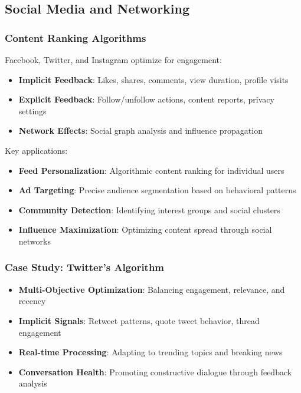 \documentclass[acmsmall,review,anonymous]{acmart}
\begin{document}
\subsection{Social Media and Networking}

\subsubsection{Content Ranking Algorithms}

Facebook, Twitter, and Instagram optimize for engagement:

\begin{itemize}
    \item \textbf{Implicit Feedback}: Likes, shares, comments, view duration, profile visits
    \item \textbf{Explicit Feedback}: Follow/unfollow actions, content reports, privacy settings
    \item \textbf{Network Effects}: Social graph analysis and influence propagation
\end{itemize}

Key applications:
\begin{itemize}
    \item \textbf{Feed Personalization}: Algorithmic content ranking for individual users
    \item \textbf{Ad Targeting}: Precise audience segmentation based on behavioral patterns
    \item \textbf{Community Detection}: Identifying interest groups and social clusters
    \item \textbf{Influence Maximization}: Optimizing content spread through social networks
\end{itemize}

\subsubsection{Case Study: Twitter's Algorithm}

\begin{itemize}
    \item \textbf{Multi-Objective Optimization}: Balancing engagement, relevance, and recency
    \item \textbf{Implicit Signals}: Retweet patterns, quote tweet behavior, thread engagement
    \item \textbf{Real-time Processing}: Adapting to trending topics and breaking news
    \item \textbf{Conversation Health}: Promoting constructive dialogue through feedback analysis
\end{itemize}
\end{document}

